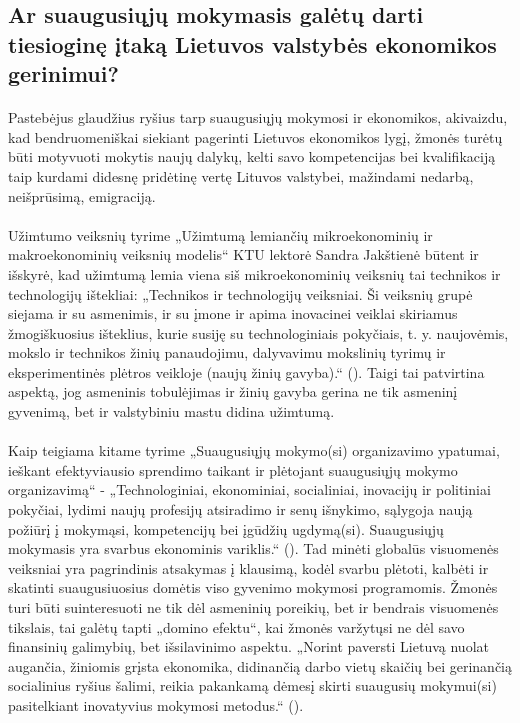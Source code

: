 \documentclass[12pt,a4paper, titlepage]{article}
\begin{document}
\subsection{Ar suaugusiųjų mokymasis galėtų darti tiesioginę įtaką Lietuvos valstybės ekonomikos gerinimui?}
\paragraph{}
	Pastebėjus glaudžius ryšius tarp suaugusiųjų mokymosi ir ekonomikos, akivaizdu, kad bendruomeniškai siekiant pagerinti Lietuvos ekonomikos lygį, žmonės turėtų būti motyvuoti mokytis naujų dalykų, kelti savo kompetencijas bei kvalifikaciją taip kurdami didesnę pridėtinę vertę Lituvos valstybei, mažindami nedarbą, neišprūsimą, emigraciją.
\paragraph{}	
	  Užimtumo veiksnių tyrime „Užimtumą lemiančių mikroekonominių ir makroekonominių veiksnių modelis“ KTU lektorė Sandra Jakštienė būtent ir išskyrė, kad užimtumą lemia viena siš mikroekonominių veiksnių tai technikos ir technologijų ištekliai: „Technikos ir technologijų veiksniai. Ši veiksnių grupė siejama ir su asmenimis, ir su įmone ir apima inovacinei veiklai skiriamus žmogiškuosius išteklius, kurie susiję su technologiniais pokyčiais, t. y. naujovėmis, mokslo ir technikos žinių panaudojimu, dalyvavimu mokslinių tyrimų ir eksperimentinės plėtros veikloje (naujų žinių gavyba).“ (\cite{jakvstiene2013uvzimtumka}). Taigi tai patvirtina aspektą, jog asmeninis tobulėjimas ir žinių gavyba gerina ne tik asmeninį gyvenimą, bet ir valstybiniu mastu didina užimtumą. 
\paragraph{}	  
	  Kaip teigiama kitame tyrime „Suaugusiųjų mokymo(si) organizavimo ypatumai, ieškant efektyviausio sprendimo taikant ir plėtojant suaugusiųjų mokymo organizavimą“ - „Technologiniai, ekonominiai, socialiniai, inovacijų ir politiniai pokyčiai, lydimi naujų profesijų atsiradimo ir senų išnykimo, sąlygoja naują požiūrį į mokymąsi, kompetencijų bei įgūdžių ugdymą(si). Suaugusiųjų mokymasis yra svarbus ekonominis variklis.“ (\cite{kvieskiene2016suaugusikujku}). Tad minėti globalūs visuomenės veiksniai yra pagrindinis atsakymas į klausimą, kodėl svarbu plėtoti, kalbėti ir skatinti suaugusiuosius domėtis viso gyvenimo mokymosi programomis. Žmonės turi būti suinteresuoti ne tik dėl asmeninių poreikių, bet ir bendrais visuomenės tikslais, tai galėtų tapti „domino efektu“, kai žmonės varžytųsi ne dėl savo finansinių galimybių, bet išsilavinimo aspektu. „Norint paversti Lietuvą nuolat augančia, žiniomis grįsta ekonomika, didinančią darbo vietų skaičių bei gerinančią socialinius ryšius šalimi, reikia pakankamą dėmesį skirti suaugusių mokymui(si) pasitelkiant inovatyvius mokymosi metodus.“ (\cite{kvieskiene2016suaugusikujku}).
\end{document}
